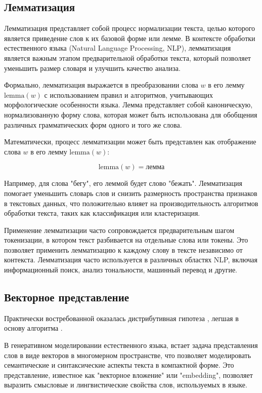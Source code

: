\subsection{Лемматизация}

Лемматизация представляет собой процесс нормализации текста, целью которого является приведение слов к их базовой форме или лемме. В контексте обработки естественного языка (Natural Language Processing, NLP), лемматизация является важным этапом предварительной обработки текста, который позволяет уменьшить размер словаря и улучшить качество анализа.

Формально, лемматизация выражается в преобразовании слова \( w \) в его лемму \( \text{lemma}(w) \) с использованием правил и алгоритмов, учитывающих морфологические особенности языка. Лемма представляет собой каноническую, нормализованную форму слова, которая может быть использована для обобщения различных грамматических форм одного и того же слова.

Математически, процесс лемматизации может быть представлен как отображение слова \( w \) в его лемму \( \text{lemma}(w) \):

\[ \text{lemma}(w) = \text{лемма} \]

Например, для слова "бегу", его леммой будет слово "бежать". Лемматизация помогает уменьшить словарь слов и снизить размерность пространства признаков в текстовых данных, что положительно влияет на производительность алгоритмов обработки текста, таких как классификация или кластеризация.

Применение лемматизации часто сопровождается предварительным шагом токенизации, в котором текст разбивается на отдельные слова или токены. Это позволяет применить лемматизацию к каждому слову в тексте независимо от контекста. Лемматизация часто используется в различных областях NLP, включая информационный поиск, анализ тональности, машинный перевод и другие.

\subsection{Векторное представление}


Практически востребованной оказалась дистрибутивная гипотеза \cite{Schutze},
легшая в основу алгоритма \cite{NIPS2013_9aa42b31}.

В генеративном моделировании естественного языка, встает задача представления слов в виде векторов в многомерном пространстве, что позволяет моделировать семантические и синтаксические аспекты текста в компактной форме. Это представление, известное как "векторное вложение" или "embedding", позволяет выразить смысловые и лингвистические свойства слов, используемых в языке.

